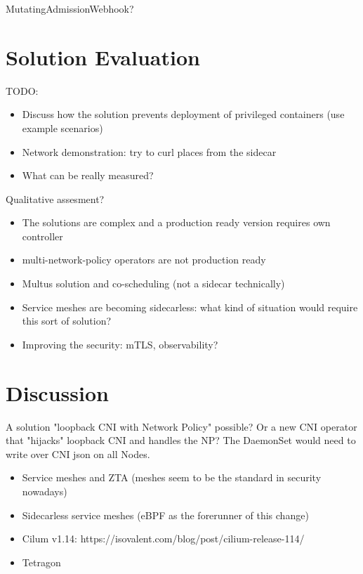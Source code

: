 \documentclass[english, 12pt, a4paper, sci, utf8, a-2b, online]{aaltothesis}
\begin{document}
MutatingAdmissionWebhook?

\clearpage

\section{Solution Evaluation} \label{sec:solution}

TODO:
\begin{itemize}
  \item Discuss how the solution prevents deployment of privileged containers (use example scenarios)
  \item Network demonstration: try to curl places from the sidecar
  \item What can be really measured?
\end{itemize}

Qualitative assesment?
\begin{itemize}
  \item The solutions are complex and a production ready version requires own controller
  \item multi-network-policy operators are not production ready
  \item Multus solution and co-scheduling (not a sidecar technically)
  \item Service meshes are becoming sidecarless: what kind of situation would require this sort of solution?
  \item Improving the security: mTLS, observability?
\end{itemize}

\clearpage

\section{Discussion} \label{sec:discussion}

A solution "loopback CNI with Network Policy" possible?
Or a new CNI operator that "hijacks" loopback CNI and handles the NP?
The DaemonSet would need to write over CNI json on all Nodes.

\begin{itemize}
  \item Service meshes and ZTA (meshes seem to be the standard in security nowadays)
  \item Sidecarless service meshes (eBPF as the forerunner of this change)
  \item Cilum v1.14: https://isovalent.com/blog/post/cilium-release-114/
  \item Tetragon %
\end{itemize}
\end{document}
